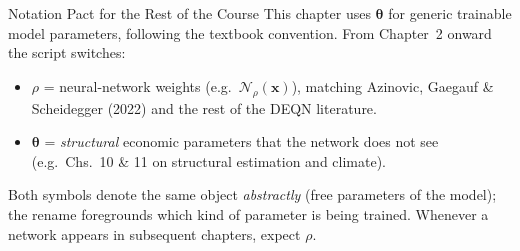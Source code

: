 \documentclass[aspectratio=169,11pt]{beamer}
\newcommand{\x}{\bm{x}}
\begin{document}
\begin{frame}{Notation Pact for the Rest of the Course}
\footnotesize
This chapter uses $\bm{\theta}$ for generic trainable model parameters, following the textbook convention.  From Chapter~2 onward the script switches:
\vspace{0.3em}
\begin{itemize}\itemsep2pt
    \item $\rho$ = neural-network weights (e.g.\ $\mathcal{N}_\rho(\x)$), matching Azinovic, Gaegauf \& Scheidegger (2022) and the rest of the DEQN literature.
    \item $\bm{\theta}$ = \emph{structural} economic parameters that the network does not see (e.g.\ Chs.~10 \& 11 on structural estimation and climate).
\end{itemize}
\vspace{0.4em}
Both symbols denote the same object \emph{abstractly} (free parameters of the model); the rename foregrounds which kind of parameter is being trained.  Whenever a network appears in subsequent chapters, expect $\rho$.
\end{frame}
\end{document}
